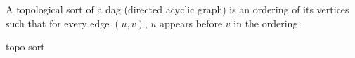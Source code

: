 A topological sort of a dag (directed acyclic graph) is an ordering of its
vertices such that for every edge $(u,v)$, $u$ appears before $v$ in the
ordering.

\begin{algorithm}{topo sort}
\end{algorithm}
